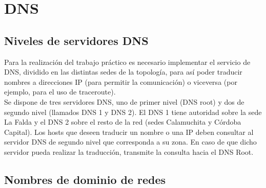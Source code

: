 \section{DNS}

\subsection{Niveles de servidores DNS}

Para la realización del trabajo práctico es necesario implementar el servicio de DNS, dividido en las distintas sedes de la topología, para así poder traducir nombres a direcciones IP (para permitir la comunicación) o viceversa (por ejemplo, para el uso de traceroute). \\ 

Se dispone de tres servidores DNS, uno de primer nivel (DNS root) y dos de segundo nivel (llamados DNS 1 y DNS 2). El DNS 1 tiene autoridad sobre la sede La Falda y el DNS 2 sobre el resto de la red (sedes Calamuchita y Córdoba Capital). Los hosts que deseen traducir un nombre o una IP deben consultar al servidor DNS de segundo nivel que corresponda a su zona. En caso de que dicho servidor pueda realizar la traducción, transmite la consulta hacia el DNS Root. \\

\subsection{Nombres de dominio de redes}

